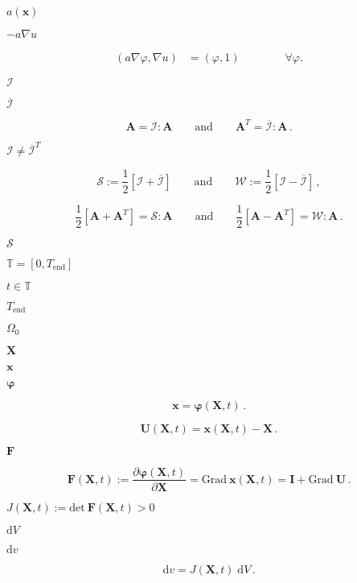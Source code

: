 \documentclass{article}
\begin{document}
$a(\mathbf x)$
\pagebreak

$-a\nabla u$
\pagebreak

\begin{align*} (a \nabla \varphi, \nabla u) &= (\varphi, 1) \qquad \qquad \forall \varphi. \end{align*}
\pagebreak

$\mathcal{I}$
\pagebreak

$\overline{\mathcal{I}}$
\pagebreak

\[ \mathbf{A} = \mathcal{I}:\mathbf{A} \qquad \text{and} \qquad \mathbf{A}^T = \overline{\mathcal{I}}:\mathbf{A} \, . \]
\pagebreak

$\mathcal{I} \neq \overline{\mathcal{I}}^T$
\pagebreak

\[ \mathcal{S} := \dfrac{1}{2}[\mathcal{I} + \overline{\mathcal{I}}] \qquad \text{and} \qquad \mathcal{W} := \dfrac{1}{2}[\mathcal{I} - \overline{\mathcal{I}}] \, , \]
\pagebreak

\[ \dfrac{1}{2}[\mathbf{A} + \mathbf{A}^T] = \mathcal{S}:\mathbf{A} \qquad \text{and} \qquad \dfrac{1}{2}[\mathbf{A} - \mathbf{A}^T] = \mathcal{W}:\mathbf{A} \, . \]
\pagebreak

$\mathcal{S}$
\pagebreak

$\mathbb{T} = [0,T_{\textrm{end}}]$
\pagebreak

$t \in \mathbb{T}$
\pagebreak

$T_{\textrm{end}}$
\pagebreak

$\Omega_0$
\pagebreak

$\mathbf{X}$
\pagebreak

$\mathbf{x}$
\pagebreak

$\boldsymbol{\varphi}$
\pagebreak

\[ \mathbf{x} = \boldsymbol{\varphi}(\mathbf{X},t) \, . \]
\pagebreak

\[ \mathbf{U}(\mathbf{X},t) = \mathbf{x}(\mathbf{X},t) - \mathbf{X} \, . \]
\pagebreak

$\mathbf{F}$
\pagebreak

\[ \mathbf{F}(\mathbf{X},t) := \dfrac{\partial \boldsymbol{\varphi}(\mathbf{X},t)}{\partial \mathbf{X}} = \textrm{Grad}\ \mathbf{x}(\mathbf{X},t) = \mathbf{I} + \textrm{Grad}\ \mathbf{U} \, . \]
\pagebreak

$J(\mathbf{X},t):= \textrm{det}\ \mathbf{F}(\mathbf{X},t) > 0$
\pagebreak

$\textrm{d}V$
\pagebreak

$\textrm{d}v$
\pagebreak

\[ \textrm{d}v = J(\mathbf{X},t)\; \textrm{d}V \, . \]
\pagebreak
\end{document}
